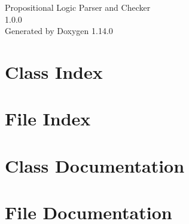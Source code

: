 \documentclass[twoside]{book}
\newcommand{\+}{\discretionary{\mbox{\scriptsize$\hookleftarrow$}}{}{}}
\newcommand{\clearemptydoublepage}{%
    \newpage{\pagestyle{empty}\cleardoublepage}%
  }
\begin{document}
  \raggedbottom
    \hypersetup{pageanchor=false,
                bookmarksnumbered=true,
                pdfencoding=unicode
               }
  \begin{titlepage}
  \vspace*{7cm}
  \begin{center}%
  {\Large Propositional Logic Parser and Checker}\\
  [1ex]\large 1.\+0.\+0 \\
  \vspace*{1cm}
  {\large Generated by Doxygen 1.14.0}\\
  \end{center}
  \end{titlepage}
  \clearemptydoublepage
  \tableofcontents
  \clearemptydoublepage
  \hypersetup{pageanchor=true}
\chapter{Class Index}

\chapter{File Index}

\chapter{Class Documentation}

\chapter{File Documentation}
















  \backmatter
  \newpage
  \clearemptydoublepage
  \printindex
\end{document}
